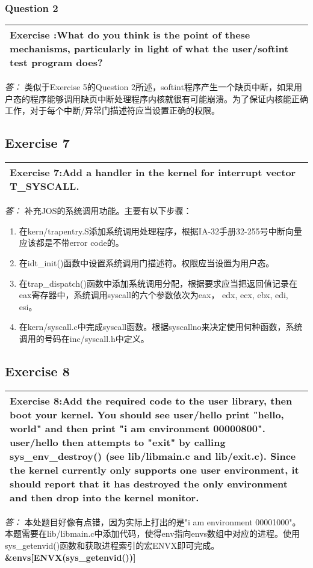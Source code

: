 \documentclass[11pt,a4paper]{article}
\newcommand{\exercise}[2]{
\begin{tabular}{|p{\textwidth}|}
\hline
Exercise #1:#2\\
\hline
\end{tabular}
\textit{\large{答：}}}
\begin{document}
\subsubsection{Question 2}
\exercise{}{What do you think is the point of these mechanisms, particularly in light of what the user/softint test program does? }
类似于Exercise 5的Question 2所述，softint程序产生一个缺页中断，如果用户态的程序能够调用缺页中断处理程序内核就很有可能崩溃。为了保证内核能正确工作，对于每个中断/异常门描述符应当设置正确的权限。

\subsection{Exercise 7}
\exercise{7}{Add a handler in the kernel for interrupt vector T\_SYSCALL.}
补充JOS的系统调用功能。主要有以下步骤：\\
\begin{enumerate}
\item 在kern/trapentry.S添加系统调用处理程序，根据IA-32手册32-255号中断向量应该都是不带error code的。
\item 在idt\_init()函数中设置系统调用门描述符。权限应当设置为用户态。
\item 在trap\_dispatch()函数中添加系统调用分配，根据要求应当把返回值记录在eax寄存器中，系统调用syscall的六个参数依次为eax， edx, ecx, ebx, edi, esi。
\item 在kern/syscall.c中完成syscall函数。根据syscallno来决定使用何种函数，系统调用的号码在inc/syscall.h中定义。
\end{enumerate}

\subsection{Exercise 8}
\exercise{8}{Add the required code to the user library, then boot your kernel. You should see user/hello  print "hello, world" and then print "i am environment 00000800". user/hello then attempts to "exit" by calling sys\_env\_destroy()  (see lib/libmain.c and lib/exit.c). Since the kernel currently only supports one user environment, it should report that it has destroyed the only environment and then drop into the kernel monitor.}
本处题目好像有点错，因为实际上打出的是"i am environment 00001000"。本题需要在lib/libmain.c中添加代码，使得env指向envs数组中对应的进程。使用sys\_getenvid()函数和获取进程索引的宏ENVX即可完成。\\
\textbf{\&envs[ENVX(sys\_getenvid())]}
\end{document}
